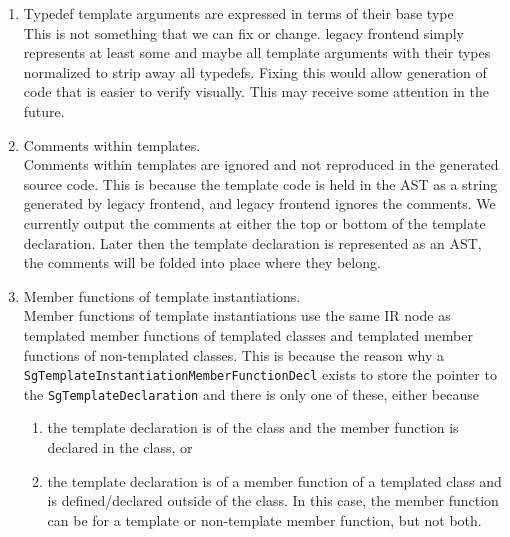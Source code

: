 \begin{enumerate}
     \item Typedef template arguments are expressed in terms of their base type \\
     This is not something that we can fix or change. legacy frontend simply represents 
     at least some and maybe all template arguments with their types normalized 
     to strip away all typedefs.  Fixing this would allow 
     generation of code that is easier to verify visually.  This may receive 
     some attention in the future.

     \item Comments within templates. \\
     Comments within templates are ignored and not reproduced in the generated
     source code.  This is because the template code is held in the AST as a string
     generated by legacy frontend, and legacy frontend ignores the comments.  We currently output the comments 
     at either the top or bottom of the template declaration.  Later then the template
     declaration is represented as an AST, the comments will be folded into place where
     they belong.

     \item Member functions of template instantiations. \\
     Member functions of template instantiations use the same IR node as 
     templated member functions of templated classes and templated member functions of
     non-templated classes.  This is because the reason why a 
     {\tt SgTemplateInstantiationMemberFunctionDecl} exists to store the pointer to the 
     {\tt SgTemplateDeclaration} and there is only one of these, either because
     \begin{enumerate}
       \item the template declaration is of the class and the member function is declared in
          the class, or
       \item the template declaration is of a member function of a templated class and is
          defined/declared outside of the class.  In this case, the member function can 
          be for a template or non-template member function, but not both.
     \end{enumerate}



\end{enumerate}

